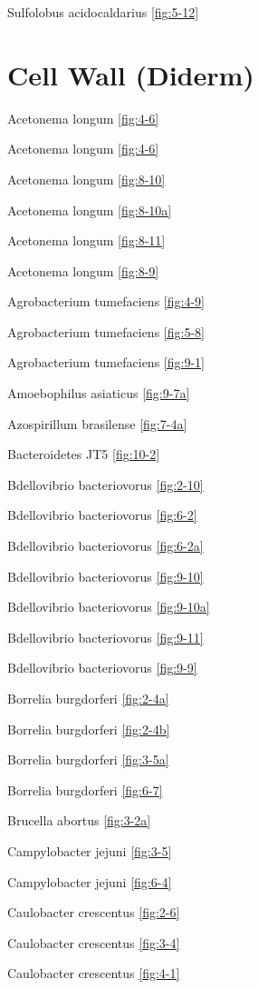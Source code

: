 \documentclass[]{tufte-book}
\begin{document}
Sulfolobus acidocaldarius \ref{fig:5-12}

\section{\texorpdfstring{\textbf{Cell Wall
(Diderm)}}{Cell Wall (Diderm)}}\label{cell-wall-diderm}

Acetonema longum \ref{fig:4-6}

Acetonema longum \ref{fig:4-6}

Acetonema longum \ref{fig:8-10}

Acetonema longum \ref{fig:8-10a}

Acetonema longum \ref{fig:8-11}

Acetonema longum \ref{fig:8-9}

Agrobacterium tumefaciens \ref{fig:4-9}

Agrobacterium tumefaciens \ref{fig:5-8}

Agrobacterium tumefaciens \ref{fig:9-1}

Amoebophilus asiaticus \ref{fig:9-7a}

Azospirillum brasilense \ref{fig:7-4a}

Bacteroidetes JT5 \ref{fig:10-2}

Bdellovibrio bacteriovorus \ref{fig:2-10}

Bdellovibrio bacteriovorus \ref{fig:6-2}

Bdellovibrio bacteriovorus \ref{fig:6-2a}

Bdellovibrio bacteriovorus \ref{fig:9-10}

Bdellovibrio bacteriovorus \ref{fig:9-10a}

Bdellovibrio bacteriovorus \ref{fig:9-11}

Bdellovibrio bacteriovorus \ref{fig:9-9}

Borrelia burgdorferi \ref{fig:2-4a}

Borrelia burgdorferi \ref{fig:2-4b}

Borrelia burgdorferi \ref{fig:3-5a}

Borrelia burgdorferi \ref{fig:6-7}

Brucella abortus \ref{fig:3-2a}

Campylobacter jejuni \ref{fig:3-5}

Campylobacter jejuni \ref{fig:6-4}

Caulobacter crescentus \ref{fig:2-6}

Caulobacter crescentus \ref{fig:3-4}

Caulobacter crescentus \ref{fig:4-1}
\end{document}
